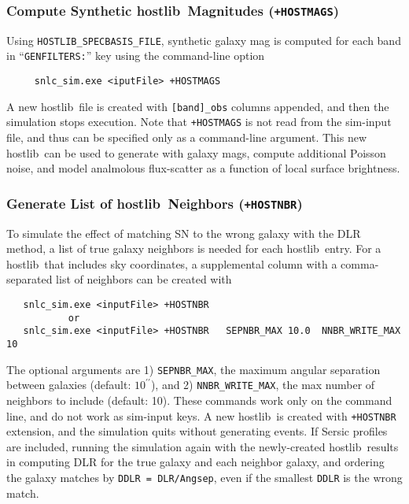 \documentclass[12pt]{article}
\newcommand{\hostlib}{{\sc hostlib}}
\begin{document}
{%
\clearpage
\subsubsection{Compute Synthetic \hostlib\ Magnitudes ({\tt +HOSTMAGS})}
\label{sss:hostlib_synmag}

Using {\tt HOSTLIB\_SPECBASIS\_FILE}, synthetic galaxy mag is 
computed for each band in ``{\tt GENFILTERS:}'' key
using the command-line option
\begin{verbatim}
     snlc_sim.exe <iputFile> +HOSTMAGS
\end{verbatim}
A new \hostlib\ file is created with {\tt [band]\_obs} columns appended,
and then the simulation stops execution.
Note that {\tt +HOSTMAGS} is not read from the sim-input file, 
and thus can be specified only as a command-line argument.
This new \hostlib\ can be used to generate with galaxy mags,
compute additional Poisson noise, and model analmolous 
flux-scatter as a function of local surface brightness.

\subsubsection{Generate List of \hostlib\ Neighbors ({\tt +HOSTNBR})}
\label{sss:hostlib_NBR}

To simulate the effect of matching SN to the wrong galaxy 
with the DLR method,
a list of true galaxy neighbors is needed for each \hostlib\ entry. 
For a \hostlib\ that includes sky coordinates, a supplemental 
column with a comma-separated list of neighbors can be created with
%
\begin{verbatim}
   snlc_sim.exe <inputFile> +HOSTNBR
           or
   snlc_sim.exe <inputFile> +HOSTNBR   SEPNBR_MAX 10.0  NNBR_WRITE_MAX 10
\end{verbatim}
%
The optional arguments are 
1) {\tt SEPNBR\_MAX}, the maximum angular separation between galaxies
  (default: $10^{\prime\prime}$), and
2) {\tt NNBR\_WRITE\_MAX}, the max number of neighbors to include
  (default: 10).
These commands work only on the command line, and do not work
as sim-input keys. A new \hostlib\ is created with {\tt +HOSTNBR}
extension, and the simulation quits without generating events.
If Sersic profiles are included, running the simulation again with the 
newly-created \hostlib\ results in computing DLR for the true galaxy and
each neighbor galaxy, and ordering the galaxy matches by 
{\tt DDLR = DLR/Angsep}, 
even if the smallest {\tt DDLR} is the wrong match.

}
\end{document}
